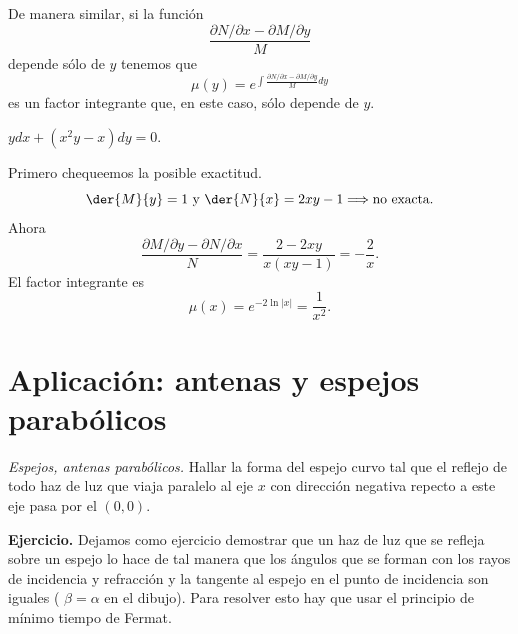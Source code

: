De manera similar, si la función
\[\frac{\partial N/\partial x-\partial M/\partial y}{M}\]
depende sólo de $y$ tenemos que
\[\mu(y)=e^{\int \frac{\partial N/\partial x-\partial M/\partial y}{M}dy}\]
es un factor integrante que, en este caso, sólo depende de $y$.

\begin{ejemplo} $ydx+(x^2y-x)dy=0$.
 \end{ejemplo}


Primero chequeemos la posible exactitud.
\[\der{M}{y}=1\text{ y } \der{N}{x}=2xy-1\Longrightarrow\text{no exacta}.\]
Ahora
\[\frac{\partial M/\partial y-\partial N/\partial x}{N}=\frac{2-2xy}{x(xy-1)}=-\frac{2}{x}.\]
El factor integrante es
\[\mu(x)=e^{-2\ln |x|}=\frac{1}{x^2}.\]





\section{Aplicación: antenas y espejos parabólicos}

\begin{ejemplo}
\textit{Espejos, antenas parabólicos.} Hallar la forma del espejo curvo tal que el reflejo de todo haz de luz que viaja paralelo al eje $x$ con dirección
negativa repecto a este eje pasa por el $(0,0)$.
\end{ejemplo}


\noindent\textbf{Ejercicio.} \actividad Dejamos como ejercicio demostrar que un haz de luz que se refleja sobre un espejo lo hace de tal manera que los ángulos que se forman con los rayos 
de incidencia y refracción y la tangente al espejo en el punto de incidencia son iguales ( $\beta=\alpha$ en el dibujo). Para resolver esto hay que usar el principio
de mínimo tiempo de Fermat.

